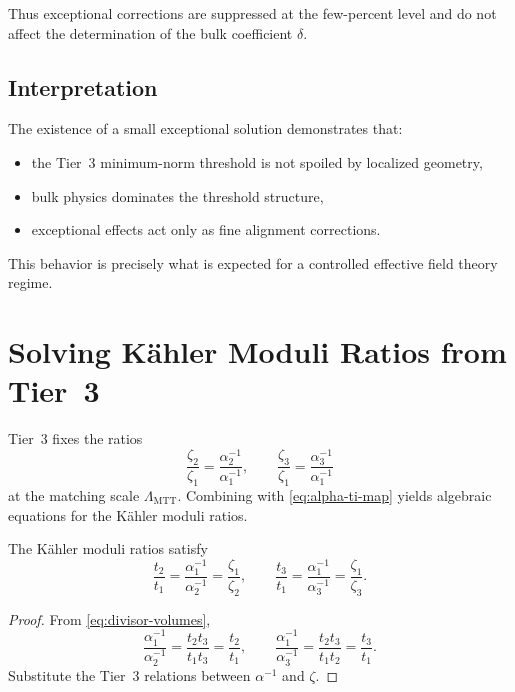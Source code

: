 \documentclass[11pt]{article}
\begin{document}
Thus exceptional corrections are suppressed at the few-percent level
and do not affect the determination of the bulk coefficient $\delta$.

\subsection{Interpretation}

\begin{remark}
The existence of a small exceptional solution demonstrates that:
\begin{itemize}
  \item the Tier~3 minimum-norm threshold is not spoiled by localized
        geometry,
  \item bulk physics dominates the threshold structure,
  \item exceptional effects act only as fine alignment corrections.
\end{itemize}
This behavior is precisely what is expected for a controlled
effective field theory regime.
\end{remark}

\section{Solving K\"ahler Moduli Ratios from Tier~3}

Tier~3 fixes the ratios
\[
\frac{\zeta_2}{\zeta_1}
=
\frac{\alpha_2^{-1}}{\alpha_1^{-1}},
\qquad
\frac{\zeta_3}{\zeta_1}
=
\frac{\alpha_3^{-1}}{\alpha_1^{-1}}
\]
at the matching scale $\Lambda_{\mathrm{MTT}}$.
Combining with \eqref{eq:alpha-ti-map} yields algebraic equations for the
K\"ahler moduli ratios.

\begin{proposition}
\label{prop:moduli-ratios}
The K\"ahler moduli ratios satisfy
\begin{equation}
\frac{t_2}{t_1}
=
\frac{\alpha_1^{-1}}{\alpha_2^{-1}}
=
\frac{\zeta_1}{\zeta_2},
\qquad
\frac{t_3}{t_1}
=
\frac{\alpha_1^{-1}}{\alpha_3^{-1}}
=
\frac{\zeta_1}{\zeta_3}.
\label{eq:ti-ratios}
\end{equation}
\end{proposition}

\begin{proof}
From \eqref{eq:divisor-volumes},
\[
\frac{\alpha_1^{-1}}{\alpha_2^{-1}}
=
\frac{t_2 t_3}{t_1 t_3}
=
\frac{t_2}{t_1},
\qquad
\frac{\alpha_1^{-1}}{\alpha_3^{-1}}
=
\frac{t_2 t_3}{t_1 t_2}
=
\frac{t_3}{t_1}.
\]
Substitute the Tier~3 relations between $\alpha^{-1}$ and $\zeta$.
\end{proof}
\end{document}
